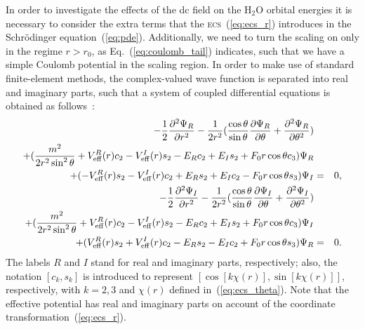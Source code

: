 In order to investigate the effects of the dc field on the H$_{2}$O
orbital energies it is necessary to consider the extra terms that the
\textsc{ecs}~(\ref{eq:ecs_r}) introduces in the Schr\"{o}dinger
equation~(\ref{eq:pde}). Additionally, we need to turn the scaling on
only in the regime $r > r_{0}$, as Eq.~(\ref{eq:coulomb_tail})
indicates, such that we have a simple Coulomb potential in the scaling
region. In order to make use of standard finite-element methods, the
complex-valued wave function is separated into real and imaginary
parts, such that a system of coupled differential equations is
obtained as follows~\cite{sarias_2016}:
%
\begin{eqnarray}
  -\frac{1}{2}\frac{\partial^{2}\Psi_{R}}{\partial r^2}-\frac{1}{2r^2}
  (\frac{\cos\theta}{\sin\theta}\frac{\partial\Psi_{R}}{\partial\theta}+
  \frac{\partial^{2}\Psi_{R}}{\partial\theta^2}) \nonumber\\
  +(\frac{m^2}{2r^2\sin^2\theta}+V_{\rm{eff}}^{R}(r)c_{2}-V_{\rm{eff}}^{I}(r)s_{2}
  -E_{R}c_{2}+E_{I}s_{2}+
  F_{0}r\cos\theta c_{3})\Psi_{R} \nonumber\\
  +(-V_{\rm{eff}}^{R}(r)s_{2}-V_{\rm{eff}}^{I}(r)c_{2}+E_{R}s_{2}+E_{I}c_{2}-F_{0}r\cos\theta
  s_{3})\Psi_{I} & = & 0, \nonumber\\
  \vspace{1cm}
  -\frac{1}{2}\frac{\partial^{2}\Psi_{I}}{\partial r^2}-\frac{1}{2r^2}
  (\frac{\cos\theta}{\sin\theta}\frac{\partial\Psi_{I}}{\partial\theta}+
  \frac{\partial^{2}\Psi_{I}}{\partial\theta^2}) \nonumber\\
  +(\frac{m^2}{2r^2\sin^2\theta}+V_{\rm{eff}}^{R}(r)c_{2}-V_{\rm{eff}}^{I}(r)s_{2}
  -E_{R}c_{2}+E_{I}s_{2}+
  F_{0}r\cos\theta c_{3})\Psi_{I} \nonumber\\
  +(V_{\rm{eff}}^{R}(r)s_{2}+V_{\rm{eff}}^{I}(r)c_{2}-E_{R}s_{2}-E_{I}c_{2}+F_{0}r\cos\theta
  s_{3})\Psi_{R} & = & 0.
\label{eq:pde_system}
\end{eqnarray}
%
The labels $R$ and $I$ stand for real and imaginary parts,
respectively; also, the notation $[c_{k},s_{k}]$ is introduced to
represent $[\cos[k\chi(r)], \sin[k\chi(r)]]$, respectively, with
$k=2,3$ and $\chi(r)$ defined in~(\ref{eq:ecs_theta}). Note that the
effective potential has real and imaginary parts on account of the
coordinate transformation~(\ref{eq:ecs_r}).
 
